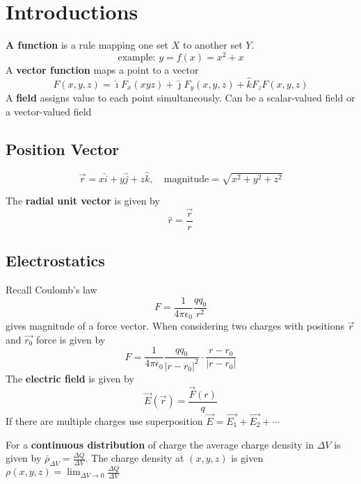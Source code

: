 \section{Introductions}
\textbf{A function} is a rule mapping one set $X$ to another set $Y$.
\begin{equation}
	\mbox{example: }y=f(x)=x^{2}+x
\end{equation}
A \textbf{vector function} maps a point to a vector
\begin{equation}
	\label{}
	F(x,y,z)=\hat{\imath}F_{x}(xyz)+\hat{\jmath}F_{y}(x,y,z)+\hat{k}F_{z}F(x,y,z)
\end{equation}
A \textbf{field} assigns value to each point simultaneously. Can be a scalar-valued field or a vector-valued field

\subsection{Position Vector}

\begin{equation}
	\label{}
	\vec{r}=x\hat{i}+y\hat{j}+z\hat{k},\quad\mbox{magnitude}=\sqrt{x^{2}+y^{2}+z^{2}}
\end{equation}


The \textbf{radial unit vector} is given by 
\begin{equation}
	\label{}
	\hat{r}=\frac{\vec{r}}{r}
\end{equation}

\subsection{Electrostatics}
Recall Coulomb's law
\begin{equation}
	\label{}
	F=\frac{1}{4\pi\epsilon_{0}}\frac{qq_{0}}{r^{2}}
\end{equation}
gives magnitude of a force vector. When considering two charges with positions $\vec{r}$ and $\vec{r_{0}}$ force is given by
\begin{equation}
	\label{}	
	F=\frac{1}{4\pi\epsilon_{0}}\frac{qq_{0}}{|r-r_{0}|^{2}}\cdot\frac{r-r_{0}}{|r-r_{0}|}
\end{equation}
The \textbf{electric field} is given by 
\begin{equation}
	\label{}
	\vec{E}(\vec{r})=\frac{\vec{F}(r)}{q}
\end{equation}
If there are multiple charges use superposition $\vec{E}=\vec{E_{1}}+\vec{E_{2}}+\cdots$


For a \textbf{continuous distribution} of charge the average charge density in $\Delta V$ is given by $\bar{\rho}_{\Delta V}=\frac{\Delta Q}{\Delta V}$. The charge density at $(x,y,z)$ is given $\rho(x,y,z)=\lim_{\Delta V\to0}\frac{\Delta Q}{\Delta V}$

